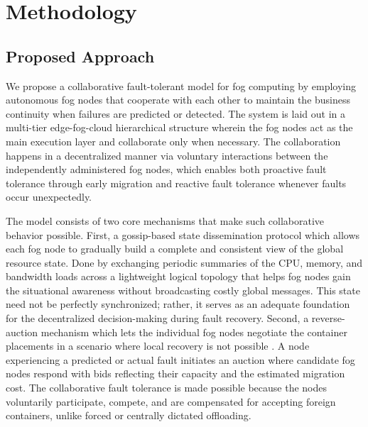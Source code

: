 \documentclass{article}
\begin{document}

\section{Methodology} \label{sec:methodology}

\subsection{Proposed Approach}
We propose a collaborative fault-tolerant model for fog computing by employing autonomous fog nodes that cooperate with each other to maintain the business continuity when failures are predicted or detected. The system is laid out in a multi-tier edge-fog-cloud hierarchical structure wherein the fog nodes act as the main execution layer and collaborate only when necessary. The collaboration happens in a decentralized manner via voluntary interactions between the independently administered fog nodes, which enables both proactive fault tolerance through early migration and reactive fault tolerance whenever faults occur unexpectedly. 

The model consists of two core mechanisms that make such collaborative behavior possible. First, a gossip-based state dissemination protocol which allows each fog node to gradually build a complete and consistent view of the global resource state. Done by exchanging periodic summaries of the CPU, memory, and bandwidth loads across a lightweight logical topology that helps fog nodes gain the situational awareness without broadcasting costly global messages. This state need not be perfectly synchronized; rather, it serves as an adequate foundation for the decentralized decision-making during fault recovery. 
Second, a reverse-auction mechanism which lets the individual fog nodes negotiate the container placements in a scenario where local recovery is not possible . A node experiencing a predicted or actual fault initiates an auction where candidate fog nodes respond with bids reflecting their capacity and the estimated migration cost. The collaborative fault tolerance is made possible because the nodes voluntarily participate, compete, and are compensated for accepting foreign containers, unlike forced or centrally dictated offloading.
\end{document}
